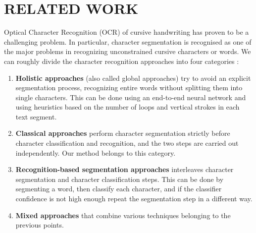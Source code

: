 \section{RELATED WORK}
\label{sec:relatedwork}

Optical Character Recognition (OCR) of cursive handwriting has proven to be a challenging problem. In particular, character segmentation is recognised as one of the major problems in recognizing unconstrained cursive characters or words. We can roughly divide the character recognition approaches into four categories \cite{Blumenstein2008-we}:

\begin{enumerate}
	\item \textbf{Holistic approaches} (also called global approaches) try to avoid an explicit segmentation process, recognizing entire words without splitting them into single characters. This can be done using an end-to-end neural network and using heuristics based on the number of loops and vertical strokes in each text segment.
	\item \textbf{Classical approaches} perform character segmentation strictly before character classification and recognition, and the two steps are carried out independently. Our method belongs to this category.
	\item \textbf{Recognition-based segmentation approaches} interleaves character segmentation and character classification steps. This can be done by segmenting a word, then classify each character, and if the classifier confidence is not high enough repeat the segmentation step in a different way.
	\item \textbf{Mixed approaches} that combine various techniques belonging to the previous points.
\end{enumerate}

